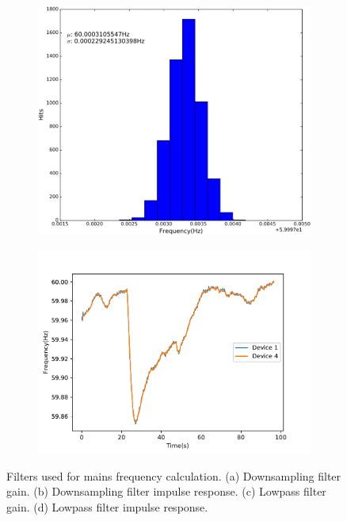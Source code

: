 \begin{figure}[h]
		\centering
	\begin{subfigure}{.5\textwidth}
	  \centering
	  \includegraphics[width=0.9\linewidth]{img/frequency_verification.png}
	  \caption{}
	  \label{fig5:sub1}
	\end{subfigure}%
	\begin{subfigure}{.5\textwidth}
	  \centering
	  \includegraphics[width=1.1\linewidth]{img/frequency_two_devices.pdf}
	  \caption{}
	  \label{fig5:sub2}
	\end{subfigure}
	\caption{Filters used for mains frequency calculation. (a) Downsampling filter gain. (b) Downsampling filter impulse response. (c) Lowpass filter gain. (d) Lowpass filter impulse response.}
	\label{fig:5}
\end{figure}

